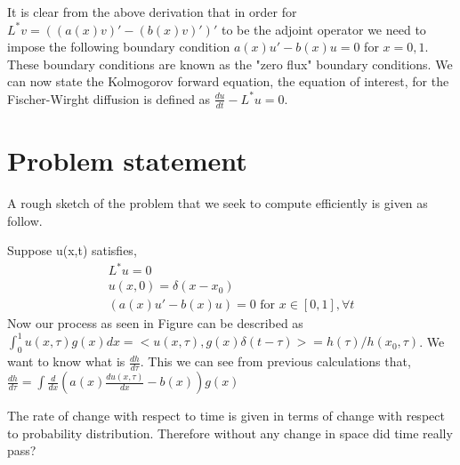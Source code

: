 \documentclass[paper=a4, fontsize=11pt]{scrartcl}
\numberwithin{equation}{section}		%
\numberwithin{figure}{section}			%
\numberwithin{table}{section}				%
\begin{document}
It is clear from the above derivation that in order for $L^*v = ((a(x)v)'-(b(x)v)')'$ to be the adjoint operator we need to impose the following boundary condition $a(x)u'- b(x)u = 0$ for $x=0,1$. These boundary conditions are known as the "zero flux" boundary conditions. We can now state the Kolmogorov forward equation, the equation of interest, for the Fischer-Wirght diffusion is defined as $\frac{du}{dt} - L^*u = 0$.

\section{Problem statement}
A rough sketch of the problem that we seek to compute efficiently is given as follow.

Suppose u(x,t) satisfies,
\begin{eqnarray*}
L^*u = 0\\
u(x,0) = \delta(x-x_0)\\
(a(x)u'- b(x)u) = 0 \text{ for } x\in[0,1], \forall t
\end{eqnarray*} 
Now our process as seen in Figure can be described as $\int_0^1u (x,\tau)g(x)dx = <u(x,\tau), g(x)\delta(t - \tau)>= h(\tau)/h(x_0,\tau)$. We want to know what is $\frac{dh}{d\tau}$. This we can see from previous calculations that,
$\frac{dh}{d\tau} = \int\frac{d}{dx}(a(x)\frac{du(x,\tau)}{dx} - b(x))g(x)$

The rate of change with respect to time is given in terms of change with respect to probability distribution. Therefore without any change in space did time really pass?

\newpage


\end{document}
